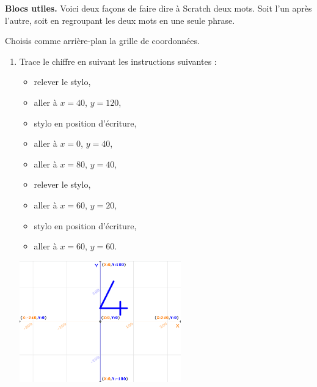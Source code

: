 \documentclass[class=report,crop=false, 12pt]{standalone}
\begin{document}
\begin{activite}
    \textbf{Blocs utiles.} Voici deux façons de faire dire à Scratch deux mots. Soit l'un après l'autre, soit en regroupant les deux mots en une seule phrase.
\begin{center}
\begin{scratch}
  \blockspace
\end{scratch}
\end{center}

\end{activite}


\begin{activite}

Choisis comme arrière-plan la grille de coordonnées.

\begin{enumerate}
  \item Trace le chiffre \og {} \fg{} en suivant les instructions suivantes :
  \begin{itemize}
    \item relever le stylo,
    \item aller à $x=40$, $y=120$,
    \item stylo en position d'écriture,
    \item aller à $x=0$, $y=40$,
    \item aller à $x=80$, $y=40$,
    \item relever le stylo,
    \item aller à $x=60$, $y=20$,
    \item stylo en position d'écriture,
    \item aller à $x=60$, $y=60$.  
  \end{itemize}
  
\begin{center}
  \includegraphics[width=0.55\textwidth]{ecran-03-ex3}   
\end{center}
  

\end{enumerate}
\end{activite}
\end{document}

